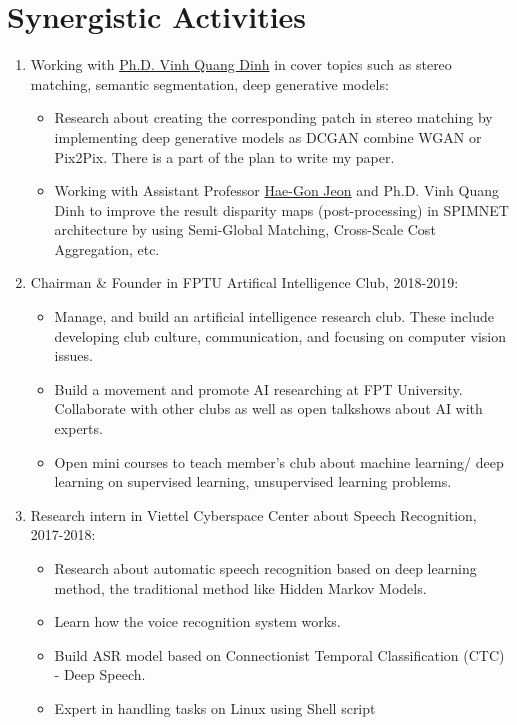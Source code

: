 \documentclass[12pt]{article}
\begin{document}
\section{Synergistic Activities}
\begin{enumerate}
    \item Working with \href{https://ieeexplore.ieee.org/author/38542826300}{Ph.D. Vinh Quang Dinh} in cover topics such as stereo matching, semantic segmentation, deep generative models:
        \begin{itemize}
            \item Research about creating the corresponding patch in stereo matching by implementing deep generative models as DCGAN combine WGAN or Pix2Pix. There is a part of the plan to write my paper.
            \item Working with Assistant Professor \href{https://scholar.google.com/citations?user=Ei00xroAAAAJ&hl=en}{Hae-Gon Jeon} and Ph.D. Vinh Quang Dinh to improve the result disparity maps (post-processing) in SPIMNET architecture by using Semi-Global Matching, Cross-Scale Cost Aggregation, etc.
        \end{itemize}
    \item Chairman \& Founder in FPTU Artifical Intelligence Club, 2018-2019:
        \begin{itemize}
        \item Manage, and build an artificial intelligence research club. These include developing club culture, communication, and focusing on computer vision issues.
        \item Build a movement and promote AI researching at FPT University. Collaborate with other clubs as well as open talkshows about AI with experts.
        \item Open mini courses to teach member's club about machine learning/ deep learning on supervised learning, unsupervised learning problems.
        \end{itemize}
    \item Research intern in Viettel Cyberspace Center about Speech Recognition, 2017-2018:
        \begin{itemize}
        \item Research about automatic speech recognition based on deep learning method, the traditional method like Hidden Markov Models.
        \item Learn how the voice recognition system works.
        \item Build ASR model based on Connectionist Temporal Classification (CTC) - Deep Speech.
        \item Expert in handling tasks on Linux using Shell script
        \end{itemize}
\end{enumerate}
\end{document}
